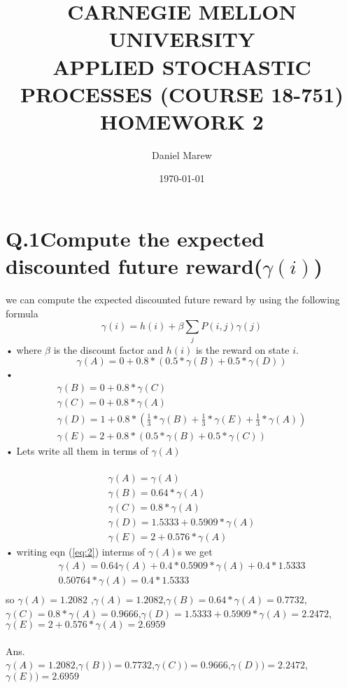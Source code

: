 \documentclass[a4paper,11pt]{article}
\begin{document}
\title{\color{red}CARNEGIE MELLON UNIVERSITY\\
APPLIED STOCHASTIC PROCESSES  (COURSE 18-751)\\
HOMEWORK 2}
\author{Daniel Marew}
\date{\today}
\maketitle
\clearpage
\newpage
\section*{Q.1\quad Compute the expected discounted future reward($\gamma (i)$)}

we can compute the expected discounted future reward by using the following formula
\begin{equation}
\gamma(i) = h(i) + \beta \sum_{j}P(i,j)\gamma(j)
\end{equation}•
where $\beta$ is the discount factor and $h(i)$ is the reward on state $i$.
\begin{equation}\label{eq:2}
\gamma(A) = 0 +  0.8*(0.5*\gamma(B)+0.5*\gamma(D))
\end{equation}•
\begin{eqnarray}
\gamma(B) = 0 +  0.8*\gamma(C)\\
\gamma(C) = 0 +  0.8*\gamma(A)\\
\gamma(D) = 1 +  0.8*(\frac{1}{3}*\gamma(B)+\frac{1}{3}*\gamma(E)+\frac{1}{3}*\gamma(A))\\
\gamma(E) = 2 +  0.8*(0.5*\gamma(B)+0.5*\gamma(C))
\end{eqnarray}•
Lets write all them in terms of  $\gamma(A)$\\\\
\begin{eqnarray}
\gamma(A) = \gamma(A)\\
\gamma(B) = 0.64*\gamma(A)\\
\gamma(C) = 0.8*\gamma(A)\\
\gamma(D) = 1.5333+0.5909*\gamma(A)\\
\gamma(E) = 2+0.576*\gamma(A)
\end{eqnarray}•
writing eqn (\ref{eq:2}) interms of $\gamma(A)$s we get \\
\begin{eqnarray}
\gamma(A) = 0.64\gamma(A) + 0.4*0.5909*\gamma(A) + 0.4*1.5333\\
0.50764*\gamma(A) = 0.4*1.5333\\
\end{eqnarray}
so $\gamma(A)=1.2082$ ,$\gamma(A)=1.2082$,\quad $\gamma(B)=0.64*\gamma(A)=0.7732$,\\ \quad$\gamma(C)=0.8*\gamma(A)=0.9666$,\quad$\gamma(D)=1.5333+0.5909*\gamma(A)=2.2472$,\quad$\gamma(E)=2+0.576*\gamma(A)=2.6959$\\\\
Ans.\\
$\gamma(A)=1.2082$,\quad $\gamma(B))=0.7732$,\quad $\gamma(C))=0.9666$,\quad $\gamma(D))=2.2472$,\quad $\gamma(E))=2.6959$
\newpage
\end{document}
